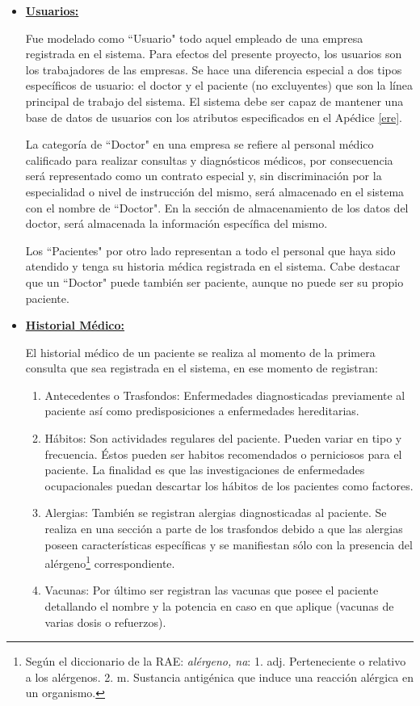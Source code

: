     \begin{itemize}
        \item \textbf{\underline{Usuarios:}}
        
        Fue modelado como ``Usuario" todo aquel empleado de una empresa registrada en el sistema. Para efectos del presente proyecto, los usuarios son los trabajadores de las empresas. Se hace una diferencia especial a dos tipos específicos de usuario: el doctor y el paciente (no excluyentes) que son la línea principal de trabajo del sistema. El sistema debe ser capaz de mantener una base de datos de usuarios con los atributos especificados en el Apédice \ref{ere}.
        
        La categoría de ``Doctor" en una empresa se refiere al personal médico calificado para realizar consultas y diagnósticos médicos, por consecuencia será representado como un contrato especial y, sin discriminación por la especialidad o nivel de instrucción del mismo, será almacenado en el sistema con el nombre de ``Doctor". En la sección de almacenamiento de los datos del doctor, será  almacenada la información específica del mismo.
        
        Los ``Pacientes" por otro lado representan a todo el personal que haya sido atendido y tenga su historia médica registrada en el sistema. Cabe destacar que un ``Doctor" puede también ser paciente, aunque no puede ser su propio paciente.
        
        \item \textbf{\underline{Historial Médico:}}
        
        El historial médico de un paciente se realiza al momento de la primera consulta que sea registrada en el sistema, en ese momento de registran:
        
        \begin{enumerate}
            \item Antecedentes o Trasfondos: Enfermedades diagnosticadas previamente al paciente así como predisposiciones a enfermedades hereditarias.
            \item Hábitos: Son actividades regulares del paciente. Pueden variar en tipo y frecuencia. Éstos pueden ser habitos recomendados o perniciosos para el paciente. La finalidad es que las investigaciones de enfermedades ocupacionales puedan descartar los hábitos de los pacientes como factores.
            \item Alergias: También se registran alergias diagnosticadas al paciente. Se realiza en una sección a parte de los trasfondos debido a que las alergias poseen características específicas y se manifiestan sólo con la presencia del alérgeno\footnote{Según el diccionario de la RAE: \textit{alérgeno, na}: 1. adj. Perteneciente o relativo a los alérgenos. 2. m. Sustancia antigénica que induce una reacción alérgica en un organismo.} correspondiente.
            \item Vacunas: Por último ser registran las vacunas que posee el paciente detallando el nombre y la potencia en caso en que aplique (vacunas de varias dosis o refuerzos).
        \end{enumerate}
        

\end{itemize}
